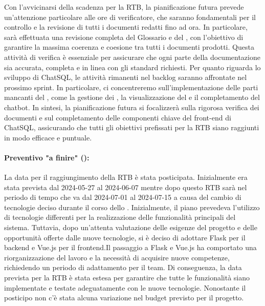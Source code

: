 Con l'avvicinarsi della scadenza per la RTB, la pianificazione futura prevede un'attenzione particolare alle ore di verificatore, che saranno fondamentali per il controllo e la revisione di tutti i documenti redatti fino ad ora. In particolare, sarà effettuata una revisione completa del Glossario e del \PdP, con l'obiettivo di garantire la massima coerenza e coesione tra tutti i documenti prodotti. Questa attività di verifica è essenziale per assicurare che ogni parte della documentazione sia accurata, completa e in linea con gli standard richiesti.
Per quanto riguarda lo sviluppo di ChatSQL, le attività rimanenti nel backlog saranno affrontate nel prossimo sprint. In particolare, ci concentreremo sull'implementazione delle parti mancanti del , come la gestione dei , la visualizzazione del  e il completamento del chatbot. 
In sintesi, la pianificazione futura si focalizzerà sulla rigorosa verifica dei documenti e sul completamento delle componenti chiave del front-end di ChatSQL, assicurando che tutti gli obiettivi prefissati per la RTB siano raggiunti in modo efficace e puntuale.



\paragraph*{Preventivo "a finire" ():}
La data per il raggiungimento della RTB è stata posticipata. Inizialmente era stata prevista dal 2024-05-27 al 2024-06-07 mentre dopo questo  RTB sarà nel periodo di tempo che va dal 2024-07-01 al 2024-07-15 a causa del cambio di tecnologie deciso durante il corso dello . Inizialmente, il piano prevedeva l'utilizzo di tecnologie differenti per la realizzazione delle funzionalità principali del sistema. Tuttavia, dopo un'attenta valutazione delle esigenze del progetto e delle opportunità offerte dalle nuove tecnologie, si è deciso di adottare Flask per il backend e Vue.js per il frontend.Il passaggio a Flask e Vue.js ha comportato una riorganizzazione del lavoro e la necessità di acquisire nuove competenze, richiedendo un periodo di adattamento per il team. Di conseguenza, la data prevista per la RTB è stata estesa per garantire che tutte le funzionalità siano implementate e testate adeguatamente con le nuove tecnologie. Nonostante il posticipo non c'è stata alcuna variazione nel budget previsto per il progetto.



